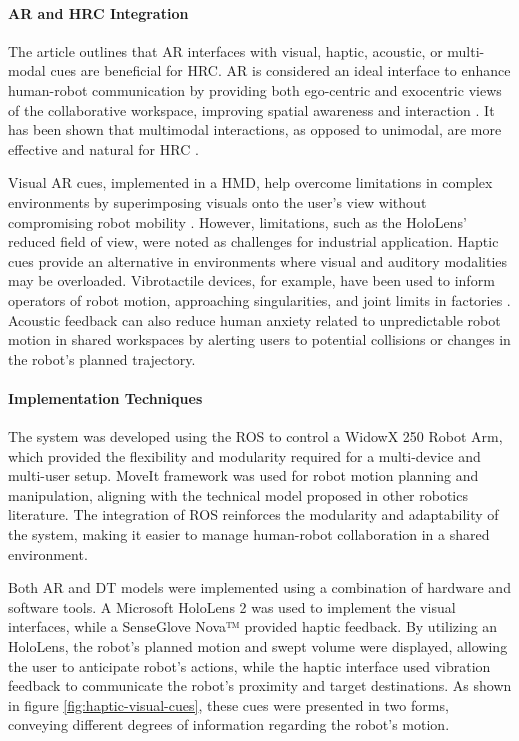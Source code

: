 \begin{enumerate}
\paragraph{\ac{AR} and HRC Integration}
The article outlines that \ac{AR} interfaces with visual, haptic, acoustic, or multi-modal cues are beneficial for \ac{HRC}. \ac{AR} is considered an ideal interface to enhance human-robot communication by providing both ego-centric and exocentric views of the collaborative workspace, improving spatial awareness and interaction \cite{10}. It has been shown that multimodal interactions, as opposed to unimodal, are more effective and natural for \ac{HRC} \cite{11}. 

Visual \ac{AR} cues, implemented in a \ac{HMD}, help overcome limitations in complex environments by superimposing visuals onto the user's view without compromising robot mobility \cite{12}. However, limitations, such as the HoloLens’ reduced field of view, were noted as challenges for industrial application. Haptic cues provide an alternative in environments where visual and auditory modalities may be overloaded. Vibrotactile devices, for example, have been used to inform operators of robot motion, approaching singularities, and joint limits in factories \cite{22}. Acoustic feedback can also reduce human anxiety related to unpredictable robot motion in shared workspaces by alerting users to potential collisions or changes in the robot's planned trajectory.

\paragraph{Implementation Techniques}
The system was developed using the \ac{ROS} to control a WidowX 250 Robot Arm, which provided the flexibility and modularity required for a multi-device and multi-user setup. MoveIt framework was used for robot motion planning and manipulation, aligning with the technical model proposed in other robotics literature. The integration of ROS reinforces the modularity and adaptability of the system, making it easier to manage human-robot collaboration in a shared environment.

Both \ac{AR} and \ac{DT} models were implemented using a combination of hardware and software tools. A Microsoft HoloLens 2 was used to implement the visual interfaces, while a SenseGlove Nova™ provided haptic feedback. By utilizing an HoloLens, the robot's planned motion and swept volume were displayed, allowing the user to anticipate robot's actions, while the haptic interface used vibration feedback to communicate the robot's proximity and target destinations. As shown in figure \ref{fig:haptic-visual-cues}, these cues were presented in two forms, conveying different degrees of information regarding the robot’s motion.


\end{enumerate}
